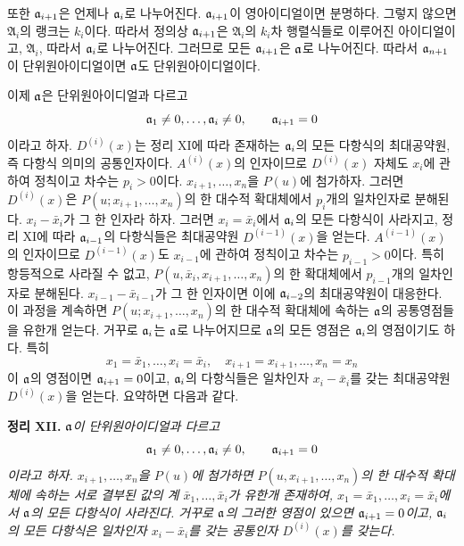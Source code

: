 또한 \(\mathfrak a_{i+1}\)은 언제나 \(\mathfrak a_i\)로 나누어진다. \(\mathfrak a_{i+1}\)이 영아이디얼이면 분명하다. 그렇지 않으면 \(\mathfrak A_i\)의 랭크는 \(k_i\)이다. 따라서 정의상 \(\mathfrak a_{i+1}\)은 \(\mathfrak A_i\)의 \(k_i\)차 행렬식들로 이루어진 아이디얼이고, \(\mathfrak A_i\), 따라서 \(\mathfrak a_i\)로 나누어진다. 그러므로 모든 \(\mathfrak a_{i+1}\)은 \(\mathfrak a\)로 나누어진다. 따라서 \(\mathfrak a_{n+1}\)이 단위원아이디얼이면 \(\mathfrak a\)도 단위원아이디얼이다.

이제 \(\mathfrak a\)은 단위원아이디얼과 다르고
\[
\mathfrak a_1\ne0,\ldots,\mathfrak a_i\ne0,\qquad
\mathfrak a_{i+1}=0
\]
이라고 하자. \(D^{(i)}(x)\)는 정리 XI에 따라 존재하는 \(\mathfrak a_i\)의 모든 다항식의 최대공약원, 즉 다항식 의미의 공통인자이다. \(A^{(i)}(x)\)의 인자이므로 \(D^{(i)}(x)\) 자체도 \(x_i\)에 관하여 정칙이고 차수는 \(p_i>0\)이다. \(x_{i+1},\ldots,x_n\)을 \(P(u)\)에 첨가하자. 그러면 \(D^{(i)}(x)\)은 \(P(u;x_{i+1},\ldots,x_n)\)의 한 대수적 확대체에서 \(p_i\)개의 일차인자로 분해된다. \(x_i-\bar x_i\)가 그 한 인자라 하자. 그러면 \(x_i=\bar x_i\)에서 \(\mathfrak a_i\)의 모든 다항식이 사라지고, 정리 XI에 따라 \(\mathfrak a_{i-1}\)의 다항식들은 최대공약원 \(D^{(i-1)}(x)\)을 얻는다. \(A^{(i-1)}(x)\)의 인자이므로 \(D^{(i-1)}(x)\)도 \(x_{i-1}\)에 관하여 정칙이고 차수는 \(p_{i-1}>0\)이다. 특히 항등적으로 사라질 수 없고, \(P(u,\bar x_i,x_{i+1},\ldots,x_n)\)의 한 확대체에서 \(p_{i-1}\)개의 일차인자로 분해된다. \(x_{i-1}-\bar x_{i-1}\)가 그 한 인자이면 이에 \(\mathfrak a_{i-2}\)의 최대공약원이 대응한다. 이 과정을 계속하면 \(P(u;x_{i+1},\ldots,x_n)\)의 한 대수적 확대체에 속하는 \(\mathfrak a\)의 공통영점들을 유한개 얻는다. 거꾸로 \(\mathfrak a_i\)는 \(\mathfrak a\)로 나누어지므로 \(\mathfrak a\)의 모든 영점은 \(\mathfrak a_i\)의 영점이기도 하다. 특히
\[
x_1=\bar x_1,\ldots,x_i=\bar x_i,\quad
x_{i+1}=x_{i+1},\ldots,x_n=x_n
\]
이 \(\mathfrak a\)의 영점이면 \(\mathfrak a_{i+1}=0\)이고, \(\mathfrak a_i\)의 다항식들은 일차인자 \(x_i-\bar x_i\)를 갖는 최대공약원 \(D^{(i)}(x)\)을 얻는다. 요약하면 다음과 같다.

\medskip
\noindent\textbf{정리 XII.} \emph{\(\mathfrak a\)이 단위원아이디얼과 다르고
\[
\mathfrak a_1\ne0,\ldots,\mathfrak a_i\ne0,\qquad
\mathfrak a_{i+1}=0
\]
이라고 하자. \(x_{i+1},\ldots,x_n\)을 \(P(u)\)에 첨가하면 \(P(u,x_{i+1},\ldots,x_n)\)의 한 대수적 확대체에 속하는 서로 결부된 값의 계 \(\bar x_1,\ldots,\bar x_i\)가 유한개 존재하여, \(x_1=\bar x_1,\ldots,x_i=\bar x_i\)에서 \(\mathfrak a\)의 모든 다항식이 사라진다. 거꾸로 \(\mathfrak a\)의 그러한 영점이 있으면 \(\mathfrak a_{i+1}=0\)이고, \(\mathfrak a_i\)의 모든 다항식은 일차인자 \(x_i-\bar x_i\)를 갖는 공통인자 \(D^{(i)}(x)\)를 갖는다.}

